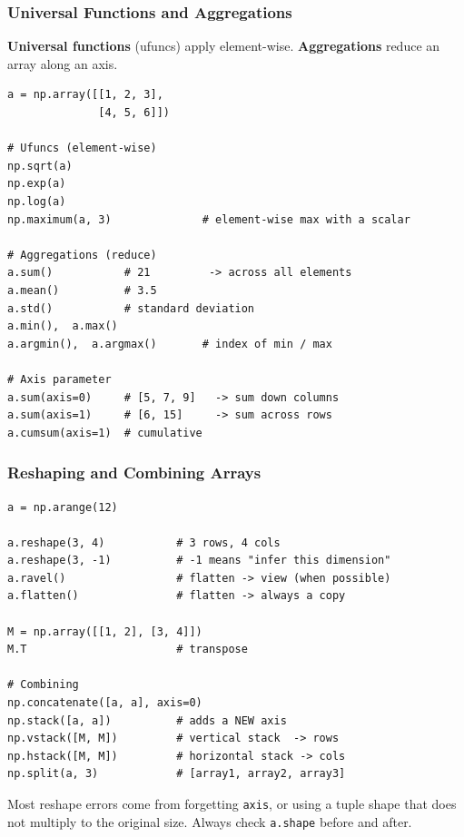 \documentclass[aspectratio=169,10pt]{beamer}
\newcommand{\keyword}[1]{\textcolor{PrimaryBlue}{\textbf{#1}}}
\newcommand{\codeword}[1]{\texttt{#1}}
\newenvironment{bluebox}[1]{%
  \vspace{0.08cm}\begin{tcolorbox}[lecturebox,title={#1},fontupper=\small]%
}{\end{tcolorbox}\vspace{0.05cm}}
\begin{document}
\begin{frame}[fragile]
\frametitle{Universal Functions and Aggregations}
\small
\keyword{Universal functions} (ufuncs) apply element-wise. \keyword{Aggregations} reduce an array along an axis.

\vspace{0.12cm}
\begin{lstlisting}[style=pycode]
a = np.array([[1, 2, 3],
              [4, 5, 6]])

# Ufuncs (element-wise)
np.sqrt(a)
np.exp(a)
np.log(a)
np.maximum(a, 3)              # element-wise max with a scalar

# Aggregations (reduce)
a.sum()           # 21         -> across all elements
a.mean()          # 3.5
a.std()           # standard deviation
a.min(),  a.max()
a.argmin(),  a.argmax()       # index of min / max

# Axis parameter
a.sum(axis=0)     # [5, 7, 9]   -> sum down columns
a.sum(axis=1)     # [6, 15]     -> sum across rows
a.cumsum(axis=1)  # cumulative
\end{lstlisting}
\end{frame}


\begin{frame}[fragile]
\frametitle{Reshaping and Combining Arrays}
\small
\begin{lstlisting}[style=pycode]
a = np.arange(12)

a.reshape(3, 4)           # 3 rows, 4 cols
a.reshape(3, -1)          # -1 means "infer this dimension"
a.ravel()                 # flatten -> view (when possible)
a.flatten()               # flatten -> always a copy

M = np.array([[1, 2], [3, 4]])
M.T                       # transpose

# Combining
np.concatenate([a, a], axis=0)
np.stack([a, a])          # adds a NEW axis
np.vstack([M, M])         # vertical stack  -> rows
np.hstack([M, M])         # horizontal stack -> cols
np.split(a, 3)            # [array1, array2, array3]
\end{lstlisting}

\begin{bluebox}{When shapes do not match}
Most reshape errors come from forgetting \codeword{axis}, or using a tuple shape that does not multiply to the original size. Always check \codeword{a.shape} before and after.
\end{bluebox}
\end{frame}
\end{document}
